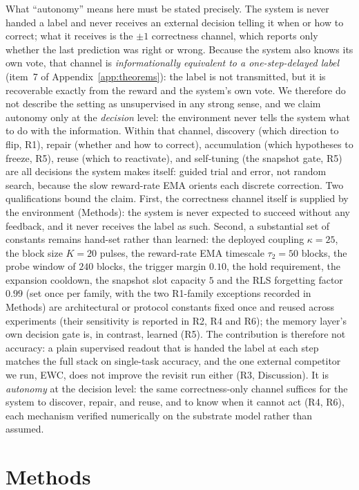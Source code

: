 \documentclass[preprint,12pt]{elsarticle}
\begin{document}
What ``autonomy'' means here must be stated precisely. The system is never
handed a label and never receives an external decision telling it when or
how to correct; what it receives is the $\pm1$ correctness channel, which
reports only whether the last prediction was right or wrong. Because the
system also knows its own vote, that channel is \emph{informationally
equivalent to a one-step-delayed label} (item~7 of
Appendix~\ref{app:theorems}): the label is not transmitted, but it is
recoverable exactly from the reward and the system's own vote. We therefore
do not describe the setting as unsupervised in any strong sense, and we
claim autonomy only at the \emph{decision} level: the environment never
tells the system what to do with the information. Within that channel,
discovery (which direction to flip, R1), repair (whether and how to
correct), accumulation (which hypotheses to freeze, R5), reuse (which to
reactivate), and self-tuning (the snapshot gate, R5) are all decisions the
system makes itself: guided trial and error, not random search, because
the slow reward-rate EMA orients each discrete correction. Two
qualifications bound the claim. First, the correctness channel itself
is supplied by the environment (Methods): the system is never expected to
succeed without any feedback, and it never receives the label as such.
Second, a substantial set of constants remains hand-set rather than learned:
the deployed coupling $\kappa=25$, the block size $K=20$ pulses, the
reward-rate EMA timescale $\tau_2=50$ blocks, the probe window of $240$
blocks, the trigger margin $0.10$, the hold requirement, the expansion
cooldown, the snapshot slot capacity $5$ and the RLS forgetting factor
$0.99$ (set once per family, with the two R1-family exceptions recorded in
Methods) are architectural or protocol constants fixed once and reused across
experiments (their sensitivity is reported in R2, R4 and R6); the memory
layer's own decision gate is, in contrast, learned (R5). The contribution is
therefore not accuracy: a plain supervised readout that is handed the label at
each step matches the full stack on single-task accuracy, and the one external
competitor we run, EWC, does not improve the revisit run either (R3,
Discussion). It is \emph{autonomy} at the
decision level: the same correctness-only channel suffices for the system to
discover, repair, and reuse, and to know when it cannot act (R4, R6), each
mechanism verified numerically on the substrate model rather than assumed.

\section{Methods}
\label{sec:methods}
\end{document}
